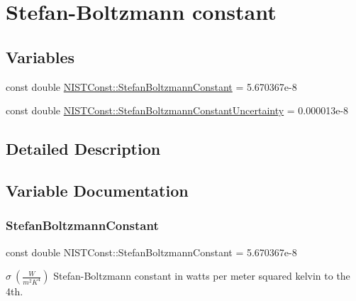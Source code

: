 \hypertarget{group___stefan_boltzmann_constant}{}\section{Stefan-\/\+Boltzmann constant}
\label{group___stefan_boltzmann_constant}
\subsection*{Variables}
\begin{DoxyCompactItemize}
\item 
const double \hyperlink{group___stefan_boltzmann_constant_ga1094e420290686333202d186399d706d}{N\+I\+S\+T\+Const\+::\+Stefan\+Boltzmann\+Constant} = 5.\+670367e-\/8
\item 
const double \hyperlink{group___stefan_boltzmann_constant_ga98b40b4f7ea1cd358d0a140bf8f6973c}{N\+I\+S\+T\+Const\+::\+Stefan\+Boltzmann\+Constant\+Uncertainty} = 0.\+000013e-\/8
\end{DoxyCompactItemize}


\subsection{Detailed Description}


\subsection{Variable Documentation}
\mbox{\label{group___stefan_boltzmann_constant_ga1094e420290686333202d186399d706d}} 
\subsubsection{\texorpdfstring{Stefan\+Boltzmann\+Constant}{StefanBoltzmannConstant}}
{\footnotesize\ttfamily const double N\+I\+S\+T\+Const\+::\+Stefan\+Boltzmann\+Constant = 5.\+670367e-\/8}

$\sigma \ (\frac{W}{m^2 K^4})$ Stefan-\/\+Boltzmann constant in watts per meter squared kelvin to the 4th. \mbox{\label{group___stefan_boltzmann_constant_ga98b40b4f7ea1cd358d0a140bf8f6973c}} 
